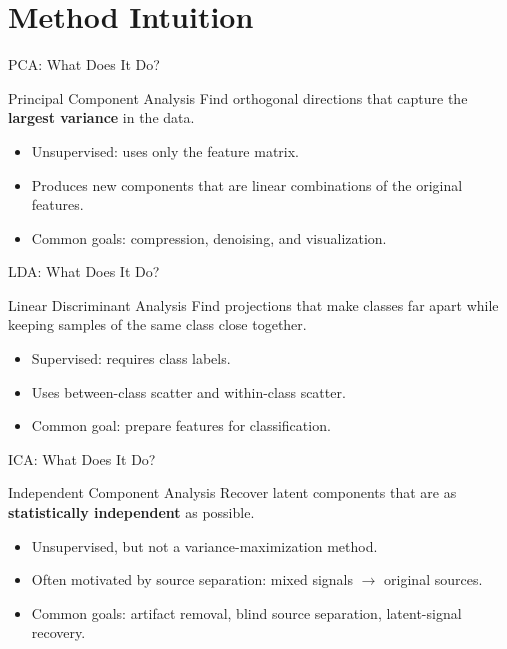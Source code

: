 \documentclass[aspectratio=169]{beamer}
\begin{document}
\section{Method Intuition}

\begin{frame}{PCA: What Does It Do?}
  \begin{block}{Principal Component Analysis}
    Find orthogonal directions that capture the \textbf{largest variance} in the data.
  \end{block}
  \begin{itemize}[<+->]
    \item Unsupervised: uses only the feature matrix.
    \item Produces new components that are linear combinations of the original features.
    \item Common goals: compression, denoising, and visualization.
  \end{itemize}
\end{frame}

\begin{frame}{LDA: What Does It Do?}
  \begin{block}{Linear Discriminant Analysis}
    Find projections that make classes far apart while keeping samples of the same class close together.
  \end{block}
  \begin{itemize}[<+->]
    \item Supervised: requires class labels.
    \item Uses between-class scatter and within-class scatter.
    \item Common goal: prepare features for classification.
  \end{itemize}
\end{frame}

\begin{frame}{ICA: What Does It Do?}
  \begin{block}{Independent Component Analysis}
    Recover latent components that are as \textbf{statistically independent} as possible.
  \end{block}
  \begin{itemize}[<+->]
    \item Unsupervised, but not a variance-maximization method.
    \item Often motivated by source separation: mixed signals $\rightarrow$ original sources.
    \item Common goals: artifact removal, blind source separation, latent-signal recovery.
  \end{itemize}
\end{frame}
\end{document}

